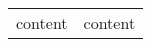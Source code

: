 \begin{table}[H]
    \centering\begin{adjustbox}{width=1\textwidth}
        \begin{tabular}{|p{}|p{}|} \hline 
            content & content \hline

        \end{tabular}
    \end{adjustbox}
\end{table}